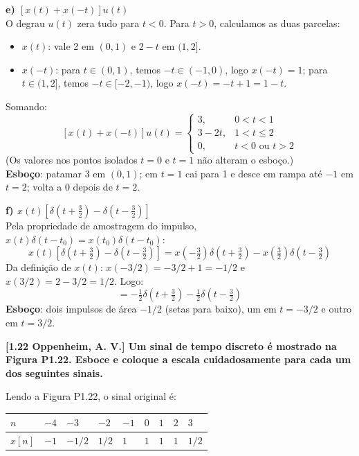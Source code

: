 \textbf{e) \([x(t) + x(-t)]u(t)\)}\\
O degrau \(u(t)\) zera tudo para \(t < 0\). Para \(t > 0\), calculamos as duas parcelas:

\begin{itemize}
\tightlist
\item
  \(x(t)\): vale 2 em \((0, 1)\) e \(2 - t\) em \((1, 2]\).
\item
  \(x(-t)\): para \(t \in (0, 1)\), temos \(-t \in (-1, 0)\), logo \(x(-t) = 1\); para \(t \in (1, 2]\), temos \(-t \in [-2, -1)\), logo \(x(-t) = -t + 1 = 1 - t\).
\end{itemize}

Somando:
\[[x(t) + x(-t)]u(t) = \begin{cases} 3, & 0 < t < 1 \\ 3 - 2t, & 1 < t \le 2 \\ 0, & t < 0 \text{ ou } t > 2 \end{cases}\]
(Os valores nos pontos isolados \(t = 0\) e \(t = 1\) não alteram o esboço.)\\
\textbf{Esboço}: patamar 3 em \((0, 1)\); em \(t = 1\) cai para 1 e desce em rampa até \(-1\) em \(t = 2\); volta a 0 depois de \(t = 2\).

\textbf{f) \(x(t)\left[\delta\left(t + \tfrac{3}{2}\right) - \delta\left(t - \tfrac{3}{2}\right)\right]\)}\\
Pela propriedade de amostragem do impulso, \(x(t)\delta(t - t_0) = x(t_0)\delta(t - t_0)\):
\[x(t)\left[\delta\left(t + \tfrac{3}{2}\right) - \delta\left(t - \tfrac{3}{2}\right)\right] = x\left(-\tfrac{3}{2}\right)\delta\left(t + \tfrac{3}{2}\right) - x\left(\tfrac{3}{2}\right)\delta\left(t - \tfrac{3}{2}\right)\]
Da definição de \(x(t)\): \(x(-3/2) = -3/2 + 1 = -1/2\) e \(x(3/2) = 2 - 3/2 = 1/2\). Logo:
\[= -\tfrac{1}{2}\delta\left(t + \tfrac{3}{2}\right) - \tfrac{1}{2}\delta\left(t - \tfrac{3}{2}\right)\]
\textbf{Esboço}: dois impulsos de área \(-1/2\) (setas para baixo), um em \(t = -3/2\) e outro em \(t = 3/2\).

\textbf{{[}1.22 Oppenheim, A. V.{]} Um sinal de tempo discreto é mostrado na Figura P1.22. Esboce e coloque a escala cuidadosamente para cada um dos seguintes sinais.}

Lendo a Figura P1.22, o sinal original é:

\begin{longtable}[]{@{}lllllllll@{}}
\toprule\noalign{}
\(n\) & \(-4\) & \(-3\) & \(-2\) & \(-1\) & \(0\) & \(1\) & \(2\) & \(3\) \\
\midrule\noalign{}
\endhead
\bottomrule\noalign{}
\endlastfoot
\(x[n]\) & \(-1\) & \(-1/2\) & \(1/2\) & \(1\) & \(1\) & \(1\) & \(1\) & \(1/2\) \\
\end{longtable}

